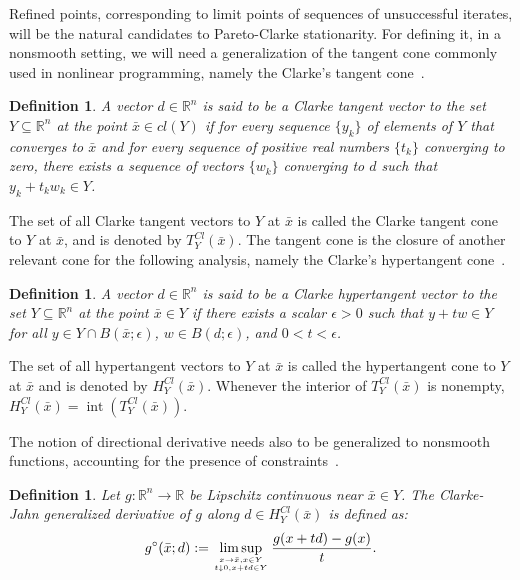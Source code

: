 \documentclass[12pt]{article}
\newtheorem{definition}[theorem]{Definition}
\DeclareMathOperator{\interior}{int}
\newcommand{\set}[1]{\{#1\}}
\begin{document}
Refined points, corresponding to limit points of sequences of
unsuccessful iterates, will be the natural candidates to
Pareto-Clarke stationarity. For defining it, in a nonsmooth
setting, we will need a generalization of the tangent cone
commonly used in nonlinear programming, namely the Clarke's
tangent cone~\cite{clarke1990}.

\begin{definition}
\label{tangent_cone} A vector $d\in\mathbb{R}^n$ is said to be a
Clarke tangent vector to the set $Y\subseteq\mathbb{R}^n$ at the
point $\bar{x} \in cl(Y)$ if for every sequence $\set{y_k}$ of
elements of $Y$ that converges to $\bar{x}$ and for every sequence
of positive real numbers $\set{t_k}$ converging to zero, there
exists a sequence of vectors $\set{w_k}$ converging to $d$ such
that $y_k+t_k w_k\in Y$.
\end{definition}

The set of all Clarke tangent vectors to $Y$ at $\bar{x}$ is
called the Clarke tangent cone to $Y$ at $\bar{x}$, and is denoted
by $T^{Cl}_Y(\bar{x})$. The tangent cone is the closure of another
relevant cone for the following analysis, namely the Clarke's
hypertangent cone~\cite{clarke1990}.

\begin{definition}
A vector $d\in\mathbb{R}^n$ is said to be a Clarke hypertangent
vector to the set $Y\subseteq\mathbb{R}^n$ at the point $\bar{x}
\in Y$ if there exists a scalar $\epsilon>0$ such that $y+t w \in
Y$ for all $y\in Y\cap B(\bar{x};\epsilon)$, $w\in B(d;\epsilon)$,
and $0<t<\epsilon$.
\end{definition}

The set of all hypertangent vectors to $Y$ at $\bar{x}$ is called
the hypertangent cone to $Y$ at $\bar{x}$ and is denoted by
$H^{Cl}_Y(\bar{x})$. Whenever the interior of $T^{Cl}_Y(\bar{x})$
is nonempty, $H^{Cl}_Y(\bar{x}) = \interior(T^{Cl}_Y(\bar{x}))$.

The notion of directional derivative needs also to be generalized
to nonsmooth functions, accounting for the presence of
constraints~\cite{clarke1990,JJahn_1996}.

\begin{definition}
Let $g:\mathbb{R}^n\to\mathbb{R}$ be Lipschitz continuous near
$\bar{x}\in Y$. The Clarke-Jahn generalized derivative of $g$
along $d\in H^{Cl}_Y(\bar{x})$ is defined as:
\begin{equation*}
g^\circ(\bar{x};d):= \limsup_{x \to \bar{x}, x \in Y \atop t
\downarrow 0, x+t d \in Y} \dfrac{g(x+t d)-g(x)}{t}.
\end{equation*}
\end{definition}
\end{document}
